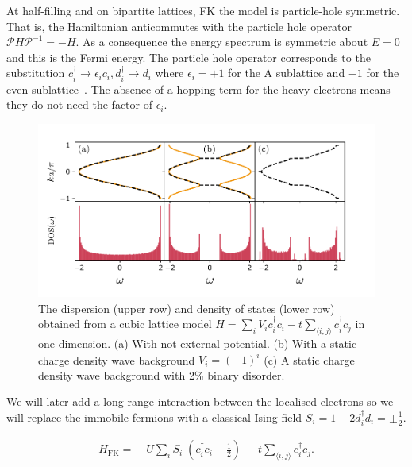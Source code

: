 At half-filling and on bipartite lattices, FK the model is particle-hole symmetric. That is, the Hamiltonian anticommutes with the particle hole operator \(\mathcal{P}H\mathcal{P}^{-1} = -H\). As a consequence the energy spectrum is symmetric about \(E = 0\) and this is the Fermi energy. The particle hole operator corresponds to the substitution \(c^\dagger_i \rightarrow \epsilon_i c_i, d^\dagger_i \rightarrow d_i\) where \(\epsilon_i = +1\) for the A sublattice and \(-1\) for the even sublattice~\autocite{gruberFalicovKimballModel2005}. The absence of a hopping term for the heavy electrons means they do not need the factor of \(\epsilon_i\).

\hypertarget{fig:simple_DOS}{%
\begin{figure}
\centering
\includegraphics[width=1\textwidth,height=\textheight]{figure_code/background_chapter/simple_DOS}
\caption[{Cubic Lattice dispersion with disorder}]{The dispersion (upper row) and density of states (lower row) obtained from a cubic lattice model \(H = \sum_{i} V_i c^\dagger_{i}c_{i} - t \sum_{\langle i,j\rangle} c^\dagger_{i}c_{j}\) in one dimension. (a) With not external potential. (b) With a static charge density wave background \(V_i = (-1)^i\) (c) A static charge density wave background with 2\% binary disorder.}
\label{fig:simple_DOS}
\end{figure}
}

We will later add a long range interaction between the localised electrons so we will replace the immobile fermions with a classical Ising field \(S_i = 1 - 2d^\dagger_id_i = \pm\tfrac{1}{2}\).

\[\begin{aligned}
H_{\mathrm{FK}} = & \;U \sum_{i} S_i\;(c^\dagger_{i}c_{i} - \tfrac{1}{2}) -\;t \sum_{\langle i,j\rangle} c^\dagger_{i}c_{j}.\\ 
\end{aligned}\]

